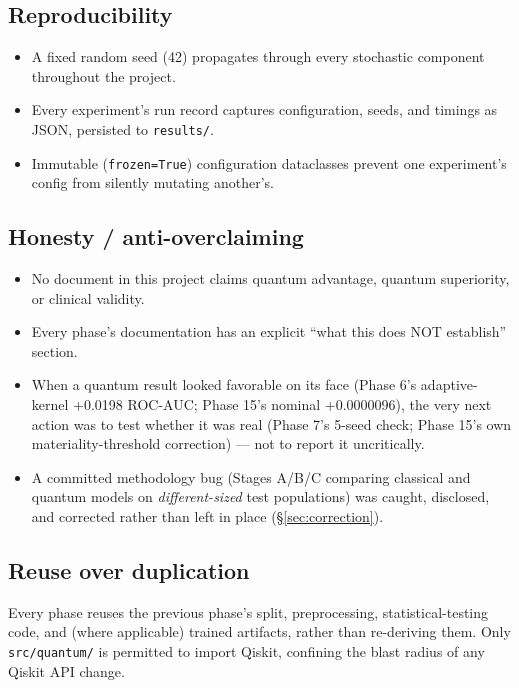 \documentclass[11pt,a4paper]{article}
\newcommand{\code}[1]{\texttt{\small #1}}
\begin{document}
\subsection{Reproducibility}
\begin{itemize}[leftmargin=1.4em]
  \item A fixed random seed (42) propagates through every stochastic component throughout the project.
  \item Every experiment's run record captures configuration, seeds, and timings as JSON, persisted to \code{results/}.
  \item Immutable (\code{frozen=True}) configuration dataclasses prevent one experiment's config from silently mutating another's.
\end{itemize}

\subsection{Honesty / anti-overclaiming}
\begin{itemize}[leftmargin=1.4em]
  \item No document in this project claims quantum advantage, quantum superiority, or clinical validity.
  \item Every phase's documentation has an explicit ``what this does NOT establish'' section.
  \item When a quantum result looked favorable on its face (Phase 6's adaptive-kernel +0.0198 ROC-AUC; Phase 15's nominal +0.0000096), the very next action was to test whether it was real (Phase 7's 5-seed check; Phase 15's own materiality-threshold correction) --- not to report it uncritically.
  \item A committed methodology bug (Stages A/B/C comparing classical and quantum models on \emph{different-sized} test populations) was caught, disclosed, and corrected rather than left in place (\S\ref{sec:correction}).
\end{itemize}

\subsection{Reuse over duplication}
Every phase reuses the previous phase's split, preprocessing, statistical-testing code, and (where applicable) trained artifacts, rather than re-deriving them. Only \code{src/quantum/} is permitted to import Qiskit, confining the blast radius of any Qiskit API change.

\end{document}

